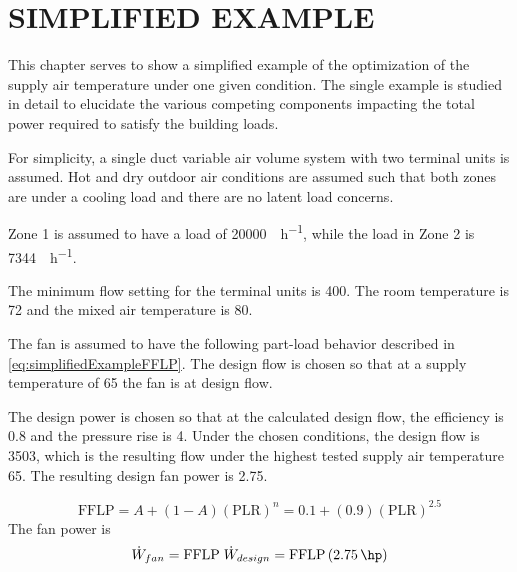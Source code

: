 \chapter{\texorpdfstring{\MakeUppercase{Simplified Example}}{Simplified Example}}

This chapter serves to show a simplified example of the optimization of
the supply air temperature under one given condition. The single example
is studied in detail to elucidate the various competing
components impacting the total power required to satisfy the building
loads. 

For simplicity, a single duct variable air volume system with two
terminal units is assumed. Hot and dry outdoor air conditions are
assumed such that both zones are under a cooling load and there are no
latent load concerns.  

Zone 1 is assumed to have a load of \SI{20000}{\btu\per\hour}, while the
load in Zone 2 is \SI{7344}{\btu\per\hour}. 

The minimum flow setting for the terminal units is \SI{400}{\cfm}. The
room temperature is \SI{72}{\degreeF} and the mixed air temperature is
\SI{80}{\degreeF}.

The fan is assumed to have the following part-load behavior described in
 \ref{eq:simplifiedExampleFFLP}. The design
flow is chosen so that at a supply temperature of \SI{65}{\degreeF} the
fan is at design flow. 

The design power is chosen so that at the calculated design flow, the
efficiency is \num{0.8} and the pressure rise is \SI{4}{\inchwater}.
Under the chosen conditions, the design flow is \SI{3503}{\cfm}, which
is the resulting flow under the highest tested supply air temperature
\SI{65}{\degreeF}. The resulting design fan power is \SI{2.75}{\hp}. 

\begin{equation}\label{eq:simplifiedExampleFFLP}
    \text{FFLP} = A + \left(1-A\right)(\text{PLR})^{n} =   0.1 + (0.9)(\text{PLR})^{2.5}
\end{equation}
The fan power is 
\begin{equation}
    \dot{W}_{fan} = \text{FFLP} \; \dot{W}_{design} = \text{FFLP}\left(\SI{2.75}{\hp}\right) 
\end{equation}

